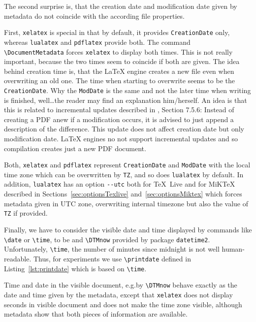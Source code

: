 \documentclass[a4paper, english]{article}%
\newcommand{\pdflatex}{\texttt{pdflatex}}
\newcommand{\lualatex}{\texttt{lualatex}}
\newcommand{\xelatex}{\texttt{xelatex}}
\newcommand{\cmd}[1]{\texttt{\textbackslash#1}}
\newcommand{\texlive}{\TeX~Live}
\newcommand{\miktex}{MiKTeX}
\begin{document}
The second surprise is, that the creation date and modification date given by metadata 
do not coincide with the according file properties. 

First, \xelatex{} is special in that by default, it provides \texttt{CreationDate} only, 
whereas \lualatex{} and \pdflatex{} provide both. 
The command \cmd{DocumentMetadata} forces \xelatex{} to display both times. 
This is not really important, because the two times seem to coincide if both are given. 
The idea behind creation time is, that the \LaTeX{} engine creates a new file 
even when overwriting an old one. 
The time when starting to overwrite seems to be the \texttt{CreationDate}. 
Why the \texttt{ModDate} is the same and not the later time when writing is finished, 
well\dots the reader may find an explanation him/herself. 
An idea is that this is related to incremental updates described in \cite{Pdf20}, Section 7.5.6: 
Instead of creating a PDF anew if a modification occurs, 
it is advised to just append a description of the difference. 
This update does not affect creation date but only modification date. 
\LaTeX{} engines no not support incremental updates 
and so compilation creates just a new PDF document. 

Both, \xelatex{} and \pdflatex{} represent \texttt{CreationDate} and \texttt{ModDate} 
with the local time zone which can be overwritten by \texttt{TZ}, and so does \lualatex{} by default. 
In addition, \lualatex{} has an option \texttt{-{}-utc} 
both for \texlive{} and for \miktex{} 
described in Sections~\ref{sec:optionsTexlive} and~\ref{sec:optionsMiktex} 
which forces metadata given in UTC zone, 
overwriting internal timezone but also the value of \texttt{TZ} if provided. 
\medskip


Finally, we have to consider the visible date and time 
displayed by commands like \cmd{date} or \cmd{time}, to be 
and \cmd{DTMnow} provided by package \texttt{datetime2}. 
Unfortunately, \cmd{time}, the number of minutes since midnight is not well human-readable. 
Thus, for experiments we use \cmd{printdate} defined in Listing~\ref{lst:printdate} 
which is based on \cmd{time}. 








Time and date in the visible document, e.g.\@ by \cmd{DTMnow} 
behave exactly as the date and time given by the metadata, 
except that \xelatex{} does not display seconds in visible document 
and does not make the time zone visible, 
although metadata show that both pieces of information are available. 
\end{document}
